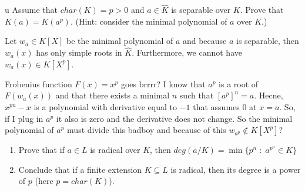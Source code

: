 \documentclass{article}
\begin{document}
%
%

\begin{problem}[7]{u}
Assume that $char(K)=p>0$ and $a\in \hat{K}$ is separable over $K$. Prove that $K(a)=K(a^p)$. (Hint: consider the minimal polynomial of $a$ over $K$.)
\end{problem}

Let $w_a\in K[X]$ be the minimal polynomial of $a$ and because $a$ is separable, then $w_a(x)$ has only simple roots in $\hat{K}$. Furthermore, we cannot have $w_a(x)\in K[X^p]$.

Frobenius function $F(x)=x^p$ goes brrrr? I know that $a^p$ is a root of $F(w_a(x))$ and that there exists a minimal $n$ such that $[a^p]^n=a$. Hecne, $x^{pn}-x$ is a polynomial with derivative equal to $-1$ that assumes $0$ at $x=a$. So, if I plug in $a^p$ it also is zero and the derivative does not change. So the minimal polynomial of $a^p$ must divide this badboy and because of this $w_{a^p}\notin K[X^p]$?






\begin{problem}[8]{}
\begin{enumerate}[label=(\alph*)]
    \item Prove that if $a\in L$ is radical over $K$, then $deg(a/K)=\min\{p^n\;:\;a^{p^n}\in K\}$
    \item Conclude that if a finite extension $K\subseteq L$ is radical, then its degree is a power of $p$ (here $p=char(K)$).
\end{enumerate}
\end{problem}
\end{document}
